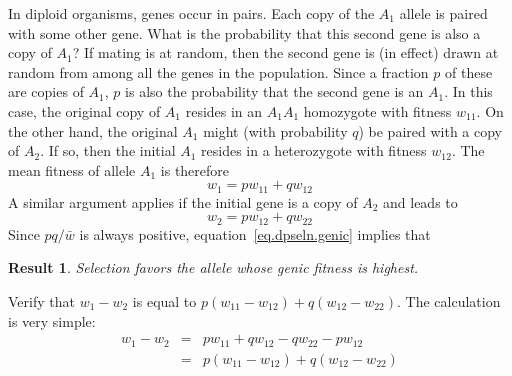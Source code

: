 \documentclass[11pt]{article}
\newtheorem{result}{Result}
\begin{document}
In diploid organisms, genes occur in pairs.  Each copy of the $A_1$
allele is paired with some other gene.  What is the probability that
this second gene is also a copy of $A_1$?  If mating is at random,
then the second gene is (in effect) drawn at random from among all the
genes in the population.  Since a fraction $p$ of these are copies of
$A_1$, $p$ is also the probability that the second gene is an $A_1$.
In this case, the original copy of $A_1$ resides in an $A_1A_1$
homozygote with fitness $w_{11}$.  On the other hand, the original
$A_1$ might (with probability $q$) be paired with a copy of $A_2$.  If
so, then the initial $A_1$ resides in a heterozygote with fitness
$w_{12}$.  The mean fitness of allele $A_1$ is therefore
\[
w_1 = p w_{11} + q w_{12}
\]
A similar argument applies if the initial gene is a copy of $A_2$ and
leads to
\[
w_2 = p w_{12} + q w_{22}
\]
Since $pq/\bar w$ is always positive, equation~\ref{eq.dpseln.genic}
implies that
\begin{result}
  Selection favors the allele whose genic fitness is highest.
\end{result}  

\begin{exercise}
\label{ex.selection.7}
Verify that $w_1-w_2$ is equal to $p (w_{11}-w_{12}) +
     q(w_{12} - w_{22})$.
\answer
The calculation is very simple:
\begin{eqnarray*}
w_1 - w_2 &=& p w_{11} + q w_{12} - q w_{22} - p w_{12}\\
 &=& p(w_{11} - w_{12}) + q(w_{12} - w_{22})
\end{eqnarray*}
\end{exercise}


\end{document}
